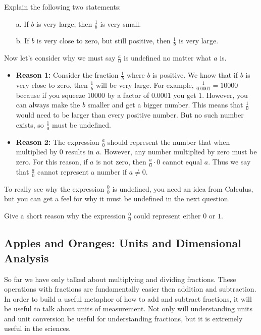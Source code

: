 \begin{question} Explain the following two statements:
\begin{enumerate}
\item[a.] If $b$ is very large, then $\frac{1}{b}$ is very small.
\item[b.] If $b$ is very close to zero, but still positive, then $\frac{1}{b}$ is very large.
\end{enumerate} 
\end{question}

\par

Now let's consider why we must say $\frac{a}{0}$ is undefined no matter what $a$ is.
\begin{itemize}
\item {\bf Reason 1:} Consider the fraction $\frac{1}{b}$ where $b$ is positive. We know that if $b$ is very close to zero, then $\frac{1}{b}$ will be very large. For example, $\frac{1}{0.0001} = 10000$ because if you squeeze $10000$ by a factor of $0.0001$ you get $1$. However, you can always make the $b$ smaller and get a bigger number. This means that $\frac{1}{0}$ would need to be larger than every positive number. But no such number exists, so $\frac{1}{0}$ must be undefined.
\item {\bf Reason 2:} The expression $\frac{a}{0}$ should represent the number that when multiplied by $0$ results in $a$. However, any number multiplied by zero must be zero. For this reason, if $a$ is not zero, then $\frac{a}{0}\cdot 0$ cannot equal $a$. Thus we say that $\frac{a}{0}$ cannot represent a number if $a\neq 0$. 
\end{itemize}

\par
   To really see why the expression $\frac{0}{0}$ is undefined, you need an idea from Calculus, but you can get a feel for why it must be undefined in the next question.
\begin{question} Give a short reason why the expression $\frac{0}{0}$ could represent either $0$ or $1$. 
\end{question}

\subsection{Apples and Oranges: Units and Dimensional Analysis}
So far we have only talked about multiplying and dividing fractions. These operations with fractions are fundamentally easier then addition and subtraction. In order to build a useful metaphor of how to add and subtract fractions, it will be useful to talk about units of measurement. Not only will understanding units and unit conversion be useful for understanding fractions, but it is extremely useful in the sciences. 

